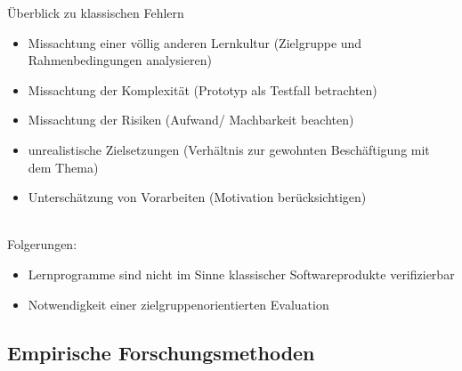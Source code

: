 \documentclass[a4paper]{article}
\begin{document}
Überblick zu klassischen Fehlern
\begin{itemize}
	\item Missachtung einer völlig anderen Lernkultur (Zielgruppe und Rahmenbedingungen analysieren)
	\item Missachtung der Komplexität (Prototyp als Testfall betrachten)
	\item Missachtung der Risiken (Aufwand/ Machbarkeit beachten)
	\item unrealistische Zielsetzungen (Verhältnis zur gewohnten Beschäftigung mit dem Thema)
	\item Unterschätzung von Vorarbeiten (Motivation berücksichtigen)
\end{itemize}
~\\
Folgerungen:
\begin{itemize}
	\item Lernprogramme sind nicht im Sinne klassischer Softwareprodukte verifizierbar
	\item Notwendigkeit einer zielgruppenorientierten Evaluation
\end{itemize}

\subsection{Empirische Forschungsmethoden}
\end{document}
